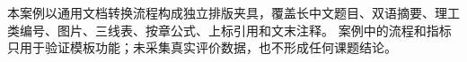 \yibinclosingchapter

本案例以通用文档转换流程构成独立排版夹具，覆盖长中文题目、双语摘要、理工类编号、图片、三线表、按章公式、上标引用和文末注释。
案例中的流程和指标只用于验证模板功能；未采集真实评价数据，也不形成任何课题结论。
